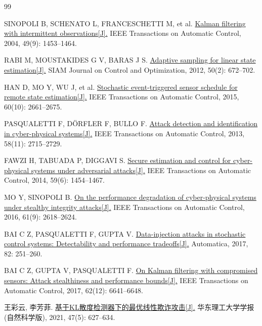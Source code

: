 \begin{thebibliography}{99}

SINOPOLI B, SCHENATO L, FRANCESCHETTI M, et al.
\href{https://doi.org/10.1109/TAC.2004.834121}{Kalman filtering with intermittent observations[J].}
IEEE Transactions on Automatic Control, 2004, 49(9): 1453--1464.

RABI M, MOUSTAKIDES G V, BARAS J S.
\href{https://doi.org/10.1137/090757125}{Adaptive sampling for linear state estimation[J].}
SIAM Journal on Control and Optimization, 2012, 50(2): 672--702.

HAN D, MO Y, WU J, et al.
\href{https://doi.org/10.1109/TAC.2015.2406975}{Stochastic event-triggered sensor schedule for remote state estimation[J].}
IEEE Transactions on Automatic Control, 2015, 60(10): 2661--2675.

PASQUALETTI F, D\"ORFLER F, BULLO F.
\href{https://doi.org/10.1109/TAC.2013.2266831}{Attack detection and identification in cyber-physical systems[J].}
IEEE Transactions on Automatic Control, 2013, 58(11): 2715--2729.

FAWZI H, TABUADA P, DIGGAVI S.
\href{https://doi.org/10.1109/TAC.2014.2303233}{Secure estimation and control for cyber-physical systems under adversarial attacks[J].}
IEEE Transactions on Automatic Control, 2014, 59(6): 1454--1467.

MO Y, SINOPOLI B.
\href{https://doi.org/10.1109/TAC.2015.2498708}{On the performance degradation of cyber-physical systems under stealthy integrity attacks[J].}
IEEE Transactions on Automatic Control, 2016, 61(9): 2618--2624.

BAI C Z, PASQUALETTI F, GUPTA V.
\href{https://doi.org/10.1016/j.automatica.2017.04.047}{Data-injection attacks in stochastic control systems: Detectability and performance tradeoffs[J].}
Automatica, 2017, 82: 251--260.

BAI C Z, GUPTA V, PASQUALETTI F.
\href{https://doi.org/10.1109/TAC.2017.2714903}{On Kalman filtering with compromised sensors: Attack stealthiness and performance bounds[J].}
IEEE Transactions on Automatic Control, 2017, 62(12): 6641--6648.

王彩云, 李芳菲.
\href{https://doi.org/10.14135/j.cnki.1006-3080.20200802001}{基于KL散度检测器下的最优线性欺诈攻击[J].}
华东理工大学学报(自然科学版), 2021, 47(5): 627--634.


\end{thebibliography}
